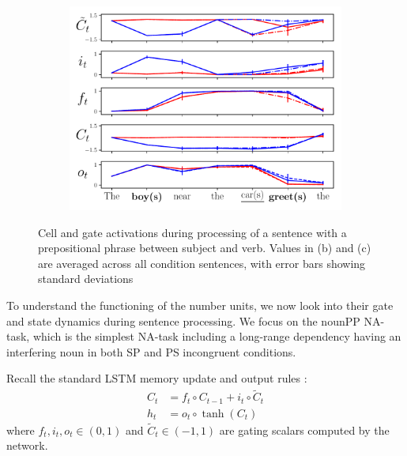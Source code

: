 \begin{figure}[ht]
\begin{subfigure}{0.32\textwidth}
    \label{fig:singular-unit}
    \end{subfigure}
    \begin{subfigure}{0.32\textwidth}
            \centering
            \includegraphics[width=\linewidth]{Figures/nounpp_775.pdf}
    \label{fig:plural-unit}
    \end{subfigure}
\caption{Cell and gate activations during processing of a sentence with a prepositional phrase between subject and verb. Values in (b) and (c) are averaged across all condition sentences, with error bars showing standard deviations}
\end{figure}

To understand the functioning of the number units, we now look
into their gate and state dynamics during sentence processing. We
focus on the nounPP NA-task, which is the simplest NA-task including a
long-range dependency having an interfering noun in both SP and PS
incongruent conditions.

Recall the standard LSTM memory update and output rules \cite{Hochreiter:Schmidhuber:1997}:
\begin{align} 
    C_t &= f_t\circ C_{t-1} + i_t\circ \widetilde{C}_t \label{eq:update-rule} \\
     h_t &= o_t\circ \tanh(C_t) \label{eq:output}
\end{align}
where $f_t, i_t, o_t \in (0,1)$ and $\widetilde{C}_t \in (-1, 1)$ are 
gating scalars computed by the network.

